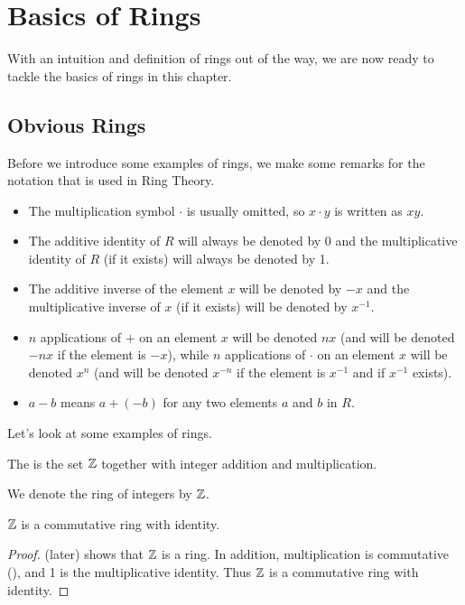\chapter{Basics of Rings}
With an intuition and definition of rings out of the way, we are now ready to tackle the basics of rings in this chapter.

\section{Obvious Rings}
Before we introduce some examples of rings, we make some remarks for the notation that is used in Ring Theory.
\begin{itemize}
    \item The multiplication symbol $\cdot$ is usually omitted, so $x \cdot y$ is written as $xy$.
    \item The additive identity of $R$ will always be denoted by 0 and the multiplicative identity of $R$ (if it exists) will always be denoted by 1.
    \item The additive inverse of the element $x$ will be denoted by $-x$ and the multiplicative inverse of $x$ (if it exists) will be denoted by $x^{-1}$.
    \item $n$ applications of $+$ on an element $x$ will be denoted $nx$ (and will be denoted $-nx$ if the element is $-x$), while $n$ applications of $\cdot$ on an element $x$ will be denoted $x^n$ (and will be denoted $x^{-n}$ if the element is $x^{-1}$ and if $x^{-1}$ exists).
    \item $a - b$ means $a + (-b)$ for any two elements $a$ and $b$ in $R$.
\end{itemize}

Let's look at some examples of rings.
\begin{definition}
    The  is the set $\mathbb{Z}$ together with integer addition and multiplication.
\end{definition}
\begin{remark}
    We denote the ring of integers by $\mathbb{Z}$.
\end{remark}
\begin{proposition}
    $\mathbb{Z}$ is a commutative ring with identity.
\end{proposition}
\begin{proof}
     (later) shows that $\mathbb{Z}$ is a ring. In addition, multiplication is commutative (), and 1 is the multiplicative identity. Thus $\mathbb{Z}$ is a commutative ring with identity.
\end{proof}

